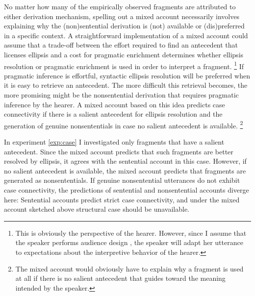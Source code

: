 No matter how many of the empirically observed fragments are attributed to either derivation mechanism, spelling out a mixed account necessarily involves explaining why the (non)sentential derivation is (not) available or (dis)\-preferred in a specific context. A straightforward implementation of a mixed account could assume that a trade-off between the effort required to find an antecedent that licenses ellipsis and a cost for pragmatic enrichment \citep{sperber.wilson1986, sperber.wilson1995,breheny.etal2006,  chevallier.etal2008} determines whether ellipsis resolution or pragmatic enrichment is used in order to interpret a fragment.%
%
\footnote{This is obviously the perspective of the hearer. However, since I assume that the speaker performs audience design \citep{bell1984}, the speaker will adapt her utterance to expectations about the interpretive behavior of the hearer.}\afterfn%
%
If pragmatic inference is effortful, syntactic ellipsis resolution will be preferred when it is easy to retrieve an antecedent. The more difficult this retrieval becomes, the more promising might be the nonsentential derivation that requires pragmatic inference by the hearer. A mixed account based on this idea predicts case connectivity if there is a salient antecedent for ellipsis resolution and the generation of genuine nonsententials in case no salient antecedent is available.%
%
\footnote{The mixed account would obviously have to explain why a fragment is used at all if there is no salient antecedent that guides toward the meaning intended by the speaker.}\afterfn%
%

In experiment \ref{exp:case} I investigated only fragments that have a salient antecedent. Since the mixed account predicts that such fragments are better resolved by ellipsis, it agrees with the sentential account in this case. However, if no salient antecedent is available, the mixed account predicts that fragments are generated as nonsententials. If genuine nonsentential utterances do not exhibit case connectivity, the predictions of sentential and nonsentential accounts diverge here: Sentential accounts predict strict case connectivity, and under the mixed account sketched above structural case should be unavailable.

